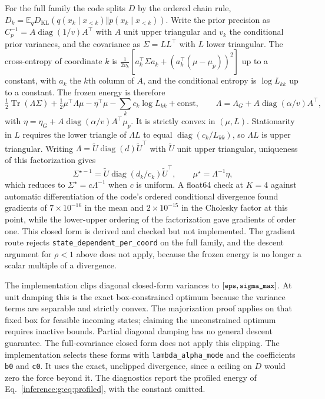 \documentclass[11pt]{article}
\theoremstyle{definition}
\theoremstyle{remark}
\providecommand{\cfg}[1]{{\small\texttt{#1}}}
\providecommand{\KL}{D_{\mathrm{KL}}}
\providecommand{\Tr}{\operatorname{Tr}}
\providecommand{\diag}{\operatorname{diag}}
\providecommand{\E}{\mathbb{E}}
\begin{document}
For the full family the code splits $D$ by the ordered chain rule, $D_k=\E_q\KL(q(x_k\mid x_{<k})\Vert p(x_k\mid x_{<k}))$. Write the prior precision as $C_p^{-1}=A\diag(1/v)A^\top$ with $A$ unit upper triangular and $v_k$ the conditional prior variances, and the covariance as $\Sigma=LL^\top$ with $L$ lower triangular. The cross-entropy of coordinate $k$ is $\tfrac1{2v_k}[a_k^\top\Sigma a_k+(a_k^\top(\mu-\mu_p))^2]$ up to a constant, with $a_k$ the $k$th column of $A$, and the conditional entropy is $\log L_{kk}$ up to a constant. The frozen energy is therefore
\begin{equation}
\tfrac12\Tr(\Lambda\Sigma)+\tfrac12\mu^\top\Lambda\mu-\eta^\top\mu-\sum_kc_k\log L_{kk}+\text{const},\qquad
\Lambda=\Lambda_G+A\diag(\alpha/v)A^\top,
\end{equation}
with $\eta=\eta_G+A\diag(\alpha/v)A^\top\mu_p$. It is strictly convex in $(\mu,L)$. Stationarity in $L$ requires the lower triangle of $\Lambda L$ to equal $\diag(c_k/L_{kk})$, so $\Lambda L$ is upper triangular. Writing $\Lambda=\tilde U\diag(d)\tilde U^\top$ with $\tilde U$ unit upper triangular, uniqueness of this factorization gives
\begin{equation}
\Sigma^{\star-1}=\tilde U\diag(d_k/c_k)\tilde U^\top,\qquad \mu^\star=\Lambda^{-1}\eta,
\end{equation}
which reduces to $\Sigma^\star=c\Lambda^{-1}$ when $c$ is uniform. A float64 check at $K=4$ against automatic differentiation of the code's ordered conditional divergence found gradients of $7\times10^{-16}$ in the mean and $2\times10^{-15}$ in the Cholesky factor at this point, while the lower-upper ordering of the factorization gave gradients of order one. This closed form is derived and checked but not implemented. The gradient route rejects \cfg{state\_dependent\_per\_coord} on the full family, and the descent argument for $\rho<1$ above does not apply, because the frozen energy is no longer a scalar multiple of a divergence.

The implementation clips diagonal closed-form variances to $[\cfg{eps},\cfg{sigma\_max}]$. At unit damping this is the exact box-constrained optimum because the variance terms are separable and strictly convex. The majorization proof applies on that fixed box for feasible incoming states; claiming the unconstrained optimum requires inactive bounds. Partial diagonal damping has no general descent guarantee. The full-covariance closed form does not apply this clipping. The implementation selects these forms with \cfg{lambda\_alpha\_mode} and the coefficients \cfg{b0} and \cfg{c0}. It uses the exact, unclipped divergence, since a ceiling on $D$ would zero the force beyond it. The diagnostics report the profiled energy of Eq.~\eqref{inference:g:eq:profiled}, with the constant omitted.
\end{document}
